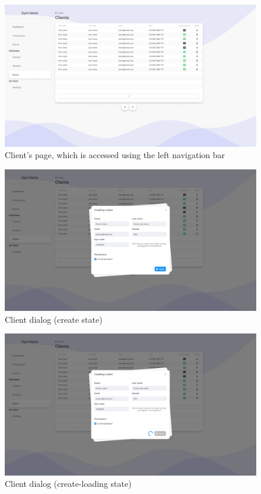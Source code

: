 \documentclass[a4paper, 12pt, oneside]{book}
\begin{document}
\begin{figure}[H]
	\centering
	\includegraphics[width=\textwidth]{assets/ui/Clients.png}
	\caption{Client's page, which is accessed using the left navigation bar}
\end{figure}
\begin{figure}[H]
	\centering
	\includegraphics[width=\textwidth]{assets/ui/ClientsCreate.png}
	\caption{Client dialog (create state)}
\end{figure}
\begin{figure}[H]
	\centering
	\includegraphics[width=\textwidth]{assets/ui/ClientsCreateLoading.png}
	\caption{Client dialog (create-loading state)}
\end{figure}
\end{document}
